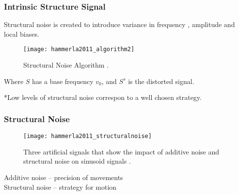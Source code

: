 \documentclass{beamer}
\begin{document}
\begin{frame}
\frametitle{Intrinsic Structure Signal}
\vspace{-0.7cm}

Structural noise is created to introduce variance in frequency , amplitude and local biases.

\begin{figure}[!htb]
\centering   
\texttt{[image: hammerla2011\_algorithm2]}
\caption[PA]{
Structural Noise Algorithm \textcolor{red}{\textbf{ \cite{Hammerla2011} }}.
}  
\label{fig:asn}
\end{figure}
Where $S$ has a base frequency $v_0$, and $S^s$ is the distorted signal.

*Low levels of structural noise correspon to a well chosen strategy.


\end{frame}





\begin{frame}
\frametitle{Structural Noise}
\vspace{-0.7cm}


\begin{figure}[!htb]
\centering    
\texttt{[image: hammerla2011\_structuralnoise]}
\caption[PA]{
Three artificial signals that show the impact of additive noise and structural 
noise on sinusoid signals \textcolor{red}{\textbf{ \cite{Hammerla2011} }}.
}  
\label{fig:sn}
\end{figure}

 

Additive noise -- precision of movements \\
Structural noise -- strategy for motion


\end{frame}
\end{document}
